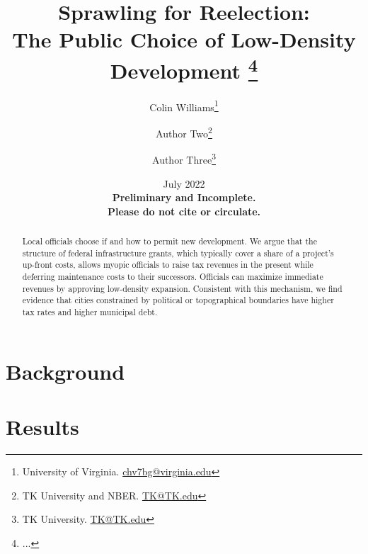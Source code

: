 \documentclass[12pt]{article}
\title{ \vspace*{-2.5cm} \hspace*{-0.5cm}Sprawling for Reelection: \\ The Public Choice of Low-Density Development \footnote{
...
}}
\author{Colin Williams\thanks{University of Virginia.
\href{mailto:chv7bg@virginia.edu}{chv7bg@virginia.edu}} \and Author Two\thanks{TK University and
NBER.  \href{mailto:TK@TK.edu}{TK@TK.edu}} \and Author Three\thanks{TK
University. \href{mailto:TK@TK.edu}{TK@TK.edu}}}
\date{ \vspace*{0.5cm} July 2022 \\
\textbf{Preliminary and Incomplete. \\ Please do not cite or circulate.}
}
\begin{document}
\bgroup
\let\footnoterule\relax

\begin{singlespace}
\maketitle


\begin{abstract}
    \noindent Local officials choose if and how to permit new development. We argue that the structure of federal infrastructure grants, which typically cover a share of a project’s up-front costs, allows myopic officials to raise tax revenues in the present while deferring maintenance costs to their successors. Officials can maximize immediate revenues by approving low-density expansion. Consistent with this mechanism, we find evidence that cities constrained by political or topographical boundaries have higher tax rates and higher municipal debt.
\end{abstract}
\end{singlespace}
\thispagestyle{empty}

\clearpage
\egroup
\setcounter{page}{1}



\noindent %


\section{Background \label{sec:background}}


\section{Results \label{sec:results}}
\end{document}
